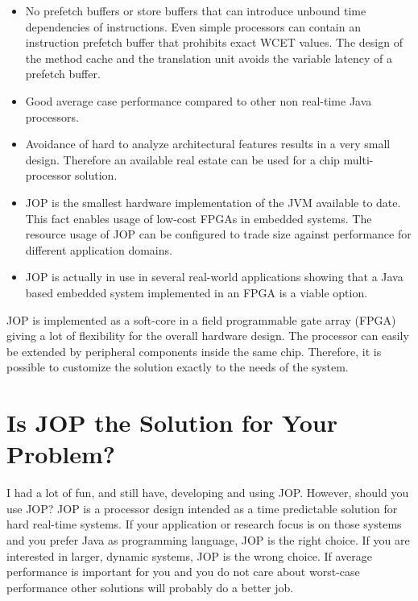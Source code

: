 \begin{itemize}
    \item No prefetch buffers or store buffers that can introduce
        unbound time dependencies of instructions. Even simple
        processors can contain an instruction prefetch buffer
        that prohibits exact WCET values. The design of the
        method cache and the translation unit avoids the variable
        latency of a prefetch buffer.

    \item Good average case performance compared to other non
        real-time Java processors.

    \item Avoidance of hard to analyze architectural features
        results in a very small design. Therefore an available
        real estate can be used for a chip multi-processor
        solution.

    \item JOP is the smallest hardware implementation of the JVM
        available to date. This fact enables usage of low-cost
        FPGAs in embedded systems. The resource usage of JOP can
        be configured to trade size against performance for
        different application domains.


    \item JOP is actually in use in several real-world
        applications showing that a Java based embedded system
        implemented in an FPGA is a viable option.

\end{itemize}

JOP is implemented as a soft-core in a field programmable gate array
(FPGA) giving a lot of flexibility for the overall hardware design.
The processor can easily be extended by peripheral components inside
the same chip. Therefore, it is possible to customize the solution
exactly to the needs of the system.


\section{Is JOP the Solution for Your Problem?}

I had a lot of fun, and still have, developing and using JOP.
However, should you use JOP? JOP is a processor design intended as a
time predictable solution for hard real-time systems. If your
application or research focus is on those systems and you prefer Java
as programming language, JOP is the right choice. If you are
interested in larger, dynamic systems, JOP is the wrong choice. If
average performance is important for you and you do not care about
worst-case performance other solutions will probably do a better job.


